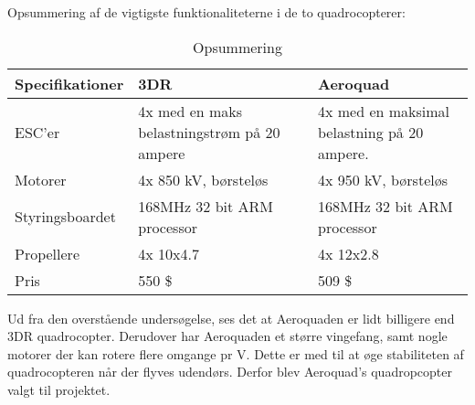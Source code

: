 Opsummering af de vigtigste funktionaliteterne i de to quadrocopterer:
\begin{table}[H]
	\centering
		\begin{tabular}{|p{3.5cm}|p{5 cm}|p{5 cm}|} 
		\hline
			\textbf{Specifikationer} & \textbf{3DR} 	& \textbf{Aeroquad} \\ \hline
					ESC'er &  4x med en maks belastningstrøm på 20 ampere				& 4x med en maksimal belastning på 20 ampere.	\\ \hline
			 		Motorer	& 4x 850 kV, børsteløs	& 4x 950 kV, børsteløs			\\ \hline
			 		Styringsboardet	& 168MHz 32 bit ARM processor				& 168MHz 32 bit ARM processor		\\ \hline
			 			Propellere & 4x 10x4.7 			& 4x 12x2.8					\\ \hline
			 			Pris & 	550 \$	& 509 \$				\\ \hline
		\end{tabular}
	\caption{Opsummering}
\end{table}

Ud fra den overstående undersøgelse, ses det at Aeroquaden er lidt billigere end 3DR quadrocopter. Derudover har Aeroquaden et større vingefang, samt nogle motorer der kan rotere flere omgange pr V. Dette er med til at øge stabiliteten af quadrocopteren når der flyves udendørs. Derfor blev Aeroquad's quadropcopter valgt til projektet.

